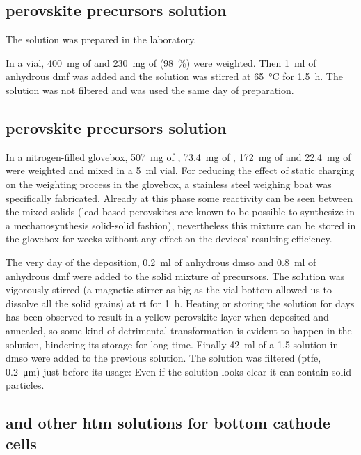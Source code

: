 	\subsection{ perovskite precursors solution}\label{precursors_mapicl}

		The solution was prepared in the laboratory.

		In a vial, \SI{400}{\mg} of  and \SI{230}{\mg} of \PbCltwo (98~\%) were weighted. Then \SI{1}{\ml} of anhydrous \gls{dmf} was added and the solution was stirred at \SI{65}{\celsius} for \SI{1.5}{\hour}. The solution was not filtered and was used the same day of preparation.

	\subsection{ perovskite precursors solution}\label{precursors_csfamapbibr}

		In a nitrogen-filled glovebox, \SI{507}{\mg} of \PbItwo, \SI{73.4}{\mg} of \PbBrtwo, \SI{172}{\mg} of  and \SI{22.4}{\mg} of  were weighted and mixed in a \SI{5}{\ml} vial. For reducing the effect of static charging on the weighting process in the glovebox, a stainless steel weighing boat was specifically fabricated. Already at this phase some reactivity can be seen between the mixed solids (lead based perovskites are known to be possible to synthesize in a mechanosynthesis solid-solid fashion), nevertheless this mixture can be stored in the glovebox for weeks without any effect on the devices' resulting efficiency.

		The very day of the deposition, \SI{0.2}{\ml} of anhydrous \gls{dmso} and \SI{0.8}{\ml} of anhydrous \gls{dmf} were added to the solid mixture of precursors. The solution was vigorously stirred (a magnetic stirrer as big as the vial bottom allowed us to dissolve all the solid grains) at \gls{rt} for \SI{1}{\hour}. Heating or storing the solution for days has been observed to result in a yellow perovskite layer when deposited and annealed, so some kind of detrimental transformation is evident to happen in the solution, hindering its storage for long time. Finally \SI{42}{\ml} of
		a \SI{1.5}{\Molar} \CsI solution in \gls{dmso} were added to the previous solution. The solution was filtered (\gls{ptfe}, \SI{0.2}{\um}) just before its usage: Even if the solution looks clear it can contain solid particles.

	\subsection{\Spiro and other \gls{htm} solutions for bottom cathode cells}

